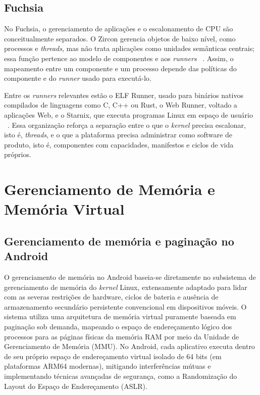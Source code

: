 \documentclass[12pt,a4paper]{article}
\begin{document}
\subsection{Fuchsia}

No Fuchsia, o gerenciamento de aplicações e o escalonamento de CPU são
conceitualmente separados. O Zircon gerencia objetos de baixo nível, como
processos e \emph{threads}, mas não trata aplicações como unidades semânticas
centrais; essa função pertence ao modelo de componentes e aos \emph{runners}
~\cite{zircon_kernel_concepts,fuchsia_components}. Assim, o mapeamento entre um
componente e um processo depende das políticas do componente e do \emph{runner}
usado para executá-lo.

Entre os \emph{runners} relevantes estão o ELF Runner, usado para binários
nativos compilados de linguagens como C, C++ ou Rust, o Web Runner, voltado a
aplicações Web, e o Starnix, que executa programas Linux em espaço de usuário
~\cite{fuchsia_components,starnix}. Essa organização reforça a separação entre o
que o \emph{kernel} precisa escalonar, isto é, \emph{threads}, e o que a
plataforma precisa administrar como software de produto, isto é, componentes com
capacidades, manifestos e ciclos de vida próprios.

\section{Gerenciamento de Memória e Memória Virtual}
\label{sec:memoria}

\subsection{Gerenciamento de memória e paginação no Android}

O gerenciamento de memória no Android baseia-se diretamente no subsistema de
gerenciamento de memória do \emph{kernel} Linux, extensamente adaptado para
lidar com as severas restrições de hardware, ciclos de bateria e ausência de
armazenamento secundário persistente convencional em dispositivos móveis. O
sistema utiliza uma arquitetura de memória virtual puramente baseada em
paginação sob demanda, mapeando o espaço de endereçamento lógico dos processos
para as páginas físicas da memória RAM por meio da Unidade de Gerenciamento de
Memória (MMU). No Android, cada aplicativo executa dentro de seu próprio espaço
de endereçamento virtual isolado de 64 bits (em plataformas ARM64 modernas),
mitigando interferências mútuas e implementando técnicas avançadas de segurança,
como a Randomização do Layout do Espaço de Endereçamento (ASLR).
\end{document}
